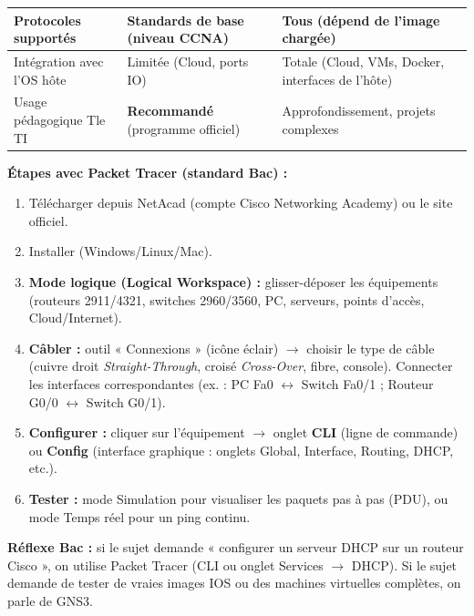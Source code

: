 \documentclass[11pt]{article}
\begin{document}
\begin{methode}
\begin{center}
\begin{tabularx}{\linewidth}{|l|X|X|}
Protocoles supportés & Standards de base (niveau CCNA) & Tous (dépend de l'image chargée) \\\hline
Intégration avec l'OS hôte & Limitée (Cloud, ports IO) & Totale (Cloud, VMs, Docker, interfaces de l'hôte) \\\hline
Usage pédagogique Tle TI & \textbf{Recommandé} (programme officiel) & Approfondissement, projets complexes \\\hline
\end{tabularx}
\end{center}
\textbf{Étapes avec Packet Tracer (standard Bac) :}
\begin{enumerate}
    \item Télécharger depuis NetAcad (compte Cisco Networking Academy) ou le site officiel.
    \item Installer (Windows/Linux/Mac).
    \item \textbf{Mode logique (Logical Workspace) :} glisser-déposer les équipements (routeurs 2911/4321, switches 2960/3560, PC, serveurs, points d'accès, Cloud/Internet).
    \item \textbf{Câbler :} outil « Connexions » (icône éclair) $\rightarrow$ choisir le type de câble (cuivre droit \emph{Straight-Through}, croisé \emph{Cross-Over}, fibre, console). Connecter les interfaces correspondantes (ex. : PC Fa0 $\leftrightarrow$ Switch Fa0/1 ; Routeur G0/0 $\leftrightarrow$ Switch G0/1).
    \item \textbf{Configurer :} cliquer sur l'équipement $\rightarrow$ onglet \textbf{CLI} (ligne de commande) ou \textbf{Config} (interface graphique : onglets Global, Interface, Routing, DHCP, etc.).
    \item \textbf{Tester :} mode Simulation pour visualiser les paquets pas à pas (PDU), ou mode Temps réel pour un ping continu.
\end{enumerate}
\textbf{Réflexe Bac :} si le sujet demande « configurer un serveur DHCP sur un routeur Cisco », on utilise Packet Tracer (CLI ou onglet Services $\rightarrow$ DHCP). Si le sujet demande de tester de vraies images IOS ou des machines virtuelles complètes, on parle de GNS3.
\end{methode}
\end{document}
